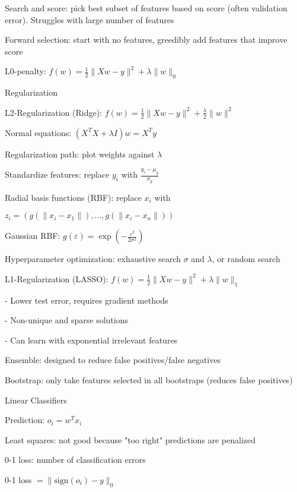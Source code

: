 \documentclass[10pt]{article}
\makeatletter
\newcommand{\tab}{\hspace{.02\textwidth}}
\renewcommand{\section}{\@startsection{section}{1}{0ex}{-1ex}{0.7ex}
                        {\normalfont\normalsize\bfseries}}
\newcommand{\norm}[1]{\lVert #1 \rVert}
\newcommand{\ep}{\varepsilon}
\newcommand{\sign}{\text{sign}}
\makeatother
\begin{document}
\begin{multicols*}{3}
Search and score: pick best subset of features based on score (often validation error). Struggles with large number of features

Forward selection: start with no features, greedibly add features that improve score

L0-penalty: $f(w)=\frac 12\norm{Xw-y}^2+\lambda\norm w_0$

\section{Regularization}

L2-Regularization (Ridge): $f(w)=\frac 12\norm{Xw-y}^2+\frac\lambda 2\norm w^2$

Normal equations: $(X^TX+\lambda I)w=X^Ty$

Regularization path: plot weights against $\lambda$

Standardize features: replace $y_i$ with $\frac{y_i-\mu_y}{\sigma_y}$

Radial basis functions (RBF): replace $x_i$ with 

\tab $z_i=(g(\norm{x_i-x_1}),\ldots,g(\norm{x_i-x_n}))$

Gaussian RBF: $g(\ep)=\exp(-\frac{\ep^2}{2\sigma^2})$

Hyperparameter optimization: exhaustive search $\sigma$ and $\lambda$, or random search

L1-Regularization (LASSO): $f(w)=\frac 12\norm{Xw-y}^2+\lambda\norm w_1$

- Lower test error, requires gradient methods

- Non-unique and sparse solutions

- Can learn with exponential irrelevant features 

Ensemble: designed to reduce false positives/false negatives

Bootstrap: only take features selected in all bootstraps (reduces false positives)

\section{Linear Classifiers}

Prediction: $o_i=w^Tx_i$

Least squares: not good because "too right" predictions are penalized

0-1 loss: number of classification errors

\tab 0-1 loss $=\norm{\sign(o_i)-y}_0$


\end{multicols*}
\end{document}
